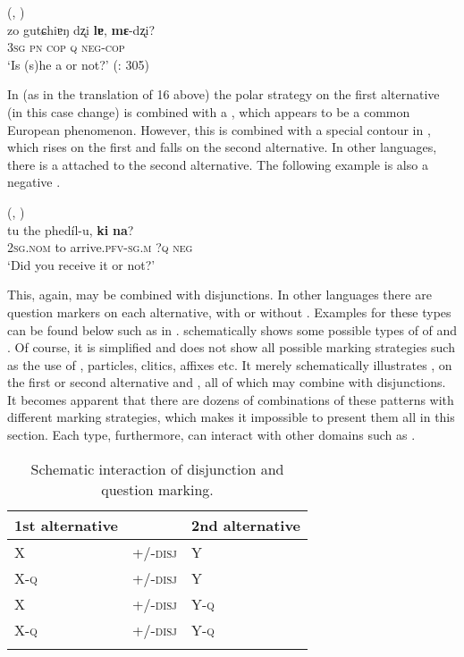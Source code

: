 \ea%
    \label{ex:4:16}
     (, )\\
    \gll zo gutɕhiɐŋ dʐi \textbf{{lɐ}}, \textbf{{mɛ}}{-dʐi}?\\
    3\textsc{sg}  \textsc{pn}    \textsc{cop}  \textsc{q}   \textsc{neg-cop}\\
    \glt ‘Is (s)he a  or not?’ (\citealt{Jiang2015}: 305)
    \z

In  (as in the translation of 16 above) the polar  strategy on the first alternative (in this case  change) is combined with a , which appears to be a common European phenomenon. However, this is combined with a special  contour in , which rises on the first and falls on the second alternative. In other languages, there is a  attached to the second alternative. The following example  is also a negative .

\ea%
    \label{ex:4:17}
     (, )\\
    \gll tu    the  phedíl-u, \textbf{{ki}} \textbf{{na}}?\\
    2\textsc{sg.nom}  to  arrive.\textsc{pfv}-\textsc{sg.m}  ?\textsc{q}  \textsc{neg}\\
    \glt ‘Did you receive it or not?’ \citep[404]{Liljegren2016}
    \z

This, again, may be combined with disjunctions. In other languages there are question markers on each alternative, with or without . Examples for these types can be found below such as in .  schematically shows some possible types of  of  and . Of course, it is simplified and does not show all possible marking strategies such as the use of , particles, clitics, affixes etc. It merely schematically illustrates ,  on the first or second alternative and , all of which may combine with disjunctions. It becomes apparent that there are dozens of combinations of these patterns with different marking strategies, which makes it impossible to present them all in this section. Each type, furthermore, can interact with other domains such as .

\begin{table}
\caption{Schematic interaction of disjunction and question marking.}
\label{tab:4:4}

\begin{tabularx}{\textwidth}{XXl}
\lsptoprule
\textbf{1st alternative} &  & \textbf{2nd alternative}\\
\midrule
X & +/-\textsc{disj} & Y\\
X-\textsc{q} & +/-\textsc{disj} & Y\\
X & +/-\textsc{disj} & Y-\textsc{q}\\
X-\textsc{q} & +/-\textsc{disj} & Y-\textsc{q}\\
\lspbottomrule
\end{tabularx}
\end{table}

